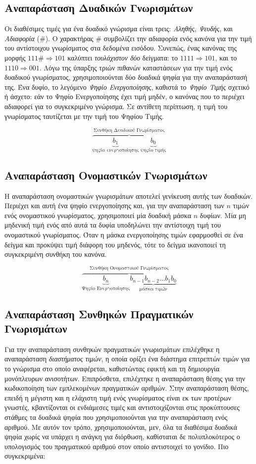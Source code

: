 \subsection{Αναπαράσταση Δυαδικών Γνωρισμάτων}
Οι διαθέσιμες τιμές για ένα δυαδικό γνώρισμα είναι τρεις: \emph{Αληθής}, \emph{Ψευδής}, και \emph{Αδιαφορία} (\#). Ο χαρακτήρας \# συμβολίζει την αδιαφορία ενός κανόνα για την τιμή του αντίστοιχου γνωρίσματος στα δεδομένα εισόδου. Συνεπώς, ένας κανόνας της μορφής $111\# \Rightarrow 101$ καλύπτει \emph{τουλάχιστον δύο} δείγματα: το $1111 \Rightarrow 101$, και το $1110 \Rightarrow 001$. Λόγω της ύπαρξης τριών πιθανών καταστάσεων για την τιμή ενός δυαδικού γνωρίσματος, χρησιμοποιούνται δύο δυαδικά ψηφία για την αναπαράστασή της. Ένα δυφίο, το λεγόμενο \emph{Ψηφίο Ενεργοποίησης}, καθιστά το \emph{Ψηφίο Τιμής} σχετικό ή άσχετο: εάν το Ψηφίο Ενεργοποίησης έχει τιμή μηδέν, ο κανόνας που το περιέχει αδιαφορεί για το συγκεκριμένο γνώρισμα. Σε αντίθετη περίπτωση, η τιμή του γνωρίσματος ταυτίζεται με την τιμή  του Ψηφίου Τιμής.

$$ \overbrace{
\underbrace{b_{1}}_\text{ψηφίο ενεργοποίησης} \:
\underbrace{b_{0}}_\text{ψηφίο τιμής}}
^\text{Συνθήκη Δυαδικού Γνωρίσματος}$$

\subsection{Αναπαράσταση Ονομαστικών Γνωρισμάτων}
Η αναπαράσταση ονομαστικών γνωρισμάτων αποτελεί γενίκευση αυτής των δυαδικών. Περιέχει και αυτή ένα ψηφίο ενεργοποίησης και, για την αναπαράσταση των $n$ τιμών ενός ονομαστικού γνωρίσματος, χρησιμοποιεί μία δυαδική μάσκα $n$ δυφίων. Μία μη μηδενική τιμή ενός από αυτά τα δυφία υποδηλώνει την αντίστοιχη τιμή του ονομαστικού γνωρίσματος. Όταν η μάσκα ενεργοποίησης τιμών εφαρμοσθεί σε ένα δείγμα και προκύψει τιμή διάφορη του μηδενός, τότε το δείγμα ικανοποιεί τη συγκεκριμένη συνθήκη του κανόνα.

$$ \overbrace{
\underbrace{b_{n}}_\text{Ψηφίο Ενεργοποίησης}
\underbrace{b_{n-1}b_{n-2}
\dots b_{1}b_{0}}_\text{μάσκα τιμών}
}^\text{Συνθήκη Ονομαστικού Γνωρίσματος}$$

\subsection{Αναπαράσταση Συνθηκών Πραγματικών Γνωρισμάτων}
Για την αναπαράσταση συνθηκών πραγματικών γνωρισμάτων επιλέχθηκε η αναπαράσταση \emph{διαστήματος τιμών}, η οποία ορίζει ένα διάστημα επιτρεπτών τιμών για το γνώρισμα στο οποίο αναφέρεται, καθιστώντας εφικτή και τη δημιουργία μονόπλευρων ανισοτήτων. Επιπρόσθετα, επιλέχτηκε η αναπαράσταση θέσης για την κωδικοποίηση των εμπλεκομένων πραγματικών αριθμών. Στην αναπαράσταση θέσης, επειδή η μέγιστη και η ελάχιστη τιμή ενός γνωρίσματος είναι εκ των προτέρων γνωστές, κβαντίζονται οι ενδιάμεσες τιμές και αντιστοιχίζονται στις προκύπτουσες στάθμες τα δυαδικά ψηφία που χρησιμοποιούνται για την αναπαράσταση ενός αριθμού. Με αυτόν τον τρόπο, χρησιμοποιούνται, μεν, όλα τα διαθέσιμα δυαδικά ψηφία χωρίς να υπάρχει η ανάγκη για διόρθωση, καθίσταται δε πολυπλοκότερος ο υπολογισμός του πραγματικού αριθμού στον οποίο αντιστοιχεί το γονίδιο. Πιο συγκεκριμένα:
\\

